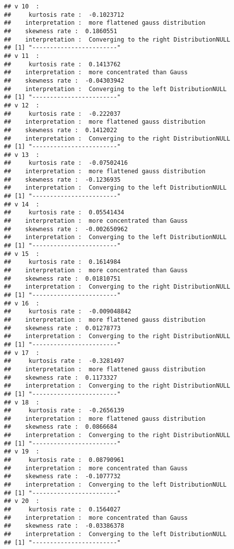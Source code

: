 \documentclass[]{article}
\begin{document}
\begin{verbatim}
## v 10  : 
##     kurtosis rate :  -0.1023712 
##    interpretation :  more flattened gauss distribution 
##    skewness rate :  0.1860551 
##    interpretation :  Converging to the right DistributionNULL
## [1] "------------------------"
## v 11  : 
##     kurtosis rate :  0.1413762 
##    interpretation :  more concentrated than Gauss 
##    skewness rate :  -0.04303942 
##    interpretation :  Converging to the left DistributionNULL
## [1] "------------------------"
## v 12  : 
##     kurtosis rate :  -0.222037 
##    interpretation :  more flattened gauss distribution 
##    skewness rate :  0.1412022 
##    interpretation :  Converging to the right DistributionNULL
## [1] "------------------------"
## v 13  : 
##     kurtosis rate :  -0.07502416 
##    interpretation :  more flattened gauss distribution 
##    skewness rate :  -0.1236935 
##    interpretation :  Converging to the left DistributionNULL
## [1] "------------------------"
## v 14  : 
##     kurtosis rate :  0.05541434 
##    interpretation :  more concentrated than Gauss 
##    skewness rate :  -0.002650962 
##    interpretation :  Converging to the left DistributionNULL
## [1] "------------------------"
## v 15  : 
##     kurtosis rate :  0.1614984 
##    interpretation :  more concentrated than Gauss 
##    skewness rate :  0.01810751 
##    interpretation :  Converging to the right DistributionNULL
## [1] "------------------------"
## v 16  : 
##     kurtosis rate :  -0.009048842 
##    interpretation :  more flattened gauss distribution 
##    skewness rate :  0.01278773 
##    interpretation :  Converging to the right DistributionNULL
## [1] "------------------------"
## v 17  : 
##     kurtosis rate :  -0.3281497 
##    interpretation :  more flattened gauss distribution 
##    skewness rate :  0.1173327 
##    interpretation :  Converging to the right DistributionNULL
## [1] "------------------------"
## v 18  : 
##     kurtosis rate :  -0.2656139 
##    interpretation :  more flattened gauss distribution 
##    skewness rate :  0.0866684 
##    interpretation :  Converging to the right DistributionNULL
## [1] "------------------------"
## v 19  : 
##     kurtosis rate :  0.08790961 
##    interpretation :  more concentrated than Gauss 
##    skewness rate :  -0.1077732 
##    interpretation :  Converging to the left DistributionNULL
## [1] "------------------------"
## v 20  : 
##     kurtosis rate :  0.1564027 
##    interpretation :  more concentrated than Gauss 
##    skewness rate :  -0.03386378 
##    interpretation :  Converging to the left DistributionNULL
## [1] "------------------------"

\end{verbatim}
\end{document}
